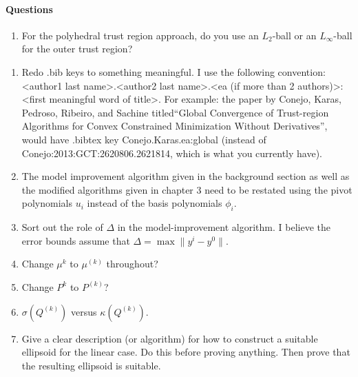 \documentclass[11pt,letterpaper]{thesis2}
\begin{document}
\paragraph{Questions}
\begin{enumerate}
\item For the polyhedral trust region approach, do you use an $L_2$-ball or an $L_{\infty}$-ball for the outer trust region?
\end{enumerate}

\begin{enumerate}
\item Redo .bib keys to something meaningful.   I use the following convention:   <author1 last name>.<author2 last name>.<ea (if more than 2 authors)>:<first meaningful word of title>.  For example:
the paper by   Conejo, Karas, Pedroso, Ribeiro, and Sachine titled``Global Convergence of Trust-region Algorithms for Convex Constrained Minimization Without Derivatives'', would have .bibtex key
Conejo.Karas.ea:global  (instead of Conejo:2013:GCT:2620806.2621814, which is what you currently have).

\item The model improvement algorithm given in the background section as well as the modified algorithms given in chapter 3 need to be restated using the pivot polynomials $u_i$ instead of the basis polynomials $\phi_i$.

\item Sort out the role of $\Delta$ in the model-improvement algorithm.  I believe the error bounds assume that $\Delta = \max \|y^i-y^0\|$.

\item Change $\mu^k$ to $\mu^{(k)}$ throughout?
\item Change $P^k$ to $P^{(k)}$?
\item $\sigma(Q^{(k)})$ versus $\kappa(Q^{(k)})$.

\item Give a clear description (or algorithm) for how to construct a suitable ellipsoid for the linear case.   Do this before proving anything.  Then prove that the resulting ellipsoid is suitable.
\end{enumerate}
\end{document}
